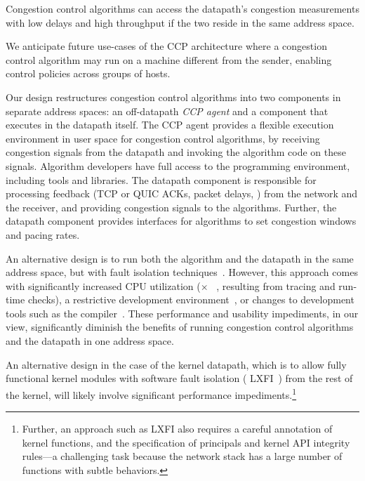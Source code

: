  Congestion control algorithms can access the datapath's
congestion measurements with low delays and high throughput if the two reside in
the same address space.

 We anticipate future use-cases of the CCP architecture where
a congestion control algorithm may run on a machine different from the sender,
enabling control policies across groups of hosts.

Our design restructures congestion control algorithms into two components in
separate address spaces: an off-datapath {\em CCP agent} and a component that
executes in the datapath itself.
%
The CCP agent provides a flexible execution environment in user space for congestion control algorithms, by receiving congestion signals from the datapath
and invoking the algorithm code on these signals.
%
Algorithm developers have full access to the \userspace programming environment, including tools and libraries.
%
The datapath component is responsible for processing feedback (\eg TCP or QUIC
ACKs, packet delays, \etc) from the network and the receiver, and providing congestion signals to the algorithms.
%
Further, the datapath component provides interfaces for algorithms to set
congestion windows and pacing rates.

An alternative design is to run both the algorithm and the datapath in the same address space, but with fault isolation techniques~\cite{sfi, xfi, bgi, lxfi, nacl, janus, systrace}. 
%
However, this approach comes with significantly increased CPU utilization ($\times$ ~\cite{lxfi, sfi, bgi, janus, systrace}, resulting from tracing and run-time checks), a restrictive development environment~\cite{nacl}, or changes to development tools such as the compiler~\cite{xfi, sfi}.
%
These performance and usability impediments, in our view, significantly diminish the benefits of running congestion control algorithms and the datapath in one address space.

An alternative design in the case of the kernel datapath, which is to allow
fully functional kernel modules with software fault isolation (\eg
LXFI~\cite{lxfi}) from the rest of the kernel, will likely involve significant
performance impediments.\footnote{Further, an approach such as LXFI also
  requires a careful annotation of kernel functions, and the specification of
  principals and kernel API integrity rules---a challenging task because the
  network stack has a large number of functions with subtle behaviors.}
%
\fi

